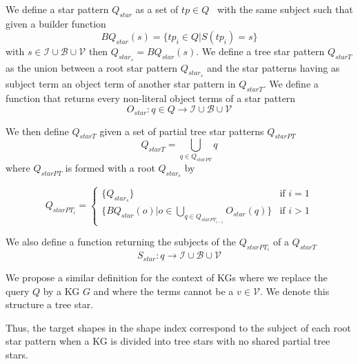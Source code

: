\begin{definition}\label{def:starPattern}
   We define a star pattern $Q_{star}$ as a set of $tp \in Q$~\cite{Karim2020} with the same subject such that 
   given a builder function 
   \begin{equation}
       BQ_{star}(s) = \{tp_i \in Q| S(tp_i) = s\}
   \end{equation}
   with $s \in \mathcal{I} \cup \mathcal{B} \cup \mathcal{V}$ then $Q_{star_s} = BQ_{star}(s)$.
   We define a tree star pattern $Q_{starT}$ as the union between a root star pattern $Q_{star_s}$
   and the star patterns having as subject term an object term of another star pattern in $Q_{starT}$.
   We define a function that returns every non-literal object terms of a star pattern
   \begin{equation}
       O_{star}: q \in Q \rightarrow  \mathcal{I} \cup \mathcal{B} \cup \mathcal{V}
   \end{equation}

   We then define $Q_{starT}$ given a  set of partial tree star patterns $Q_{starPT}$
   \begin{equation}
       Q_{starT} = \bigcup_{q \in Q_{starPT}} q
   \end{equation}
   where $Q_{starPT}$ is formed with a root $Q_{star_s}$ by

   \begin{equation}
           Q_{starPT_i} =
       \begin{cases}
           \{Q_{star_s}\} & \text{if } i = 1 \\
           \{BQ_{star}(o)| o \in \bigcup\limits_{q \in Q_{starPT_{i-1}}} O_{star}(q)\} & \text{if } i>1
       \end{cases}
   \end{equation}

   We also define a function returning the subjects of the $Q_{starPT_i}$ of a $Q_{starT}$
   \begin{equation}
       S_{star}: q \rightarrow  \mathcal{I} \cup \mathcal{B} \cup \mathcal{V}
   \end{equation}

   We propose a similar definition for the context of KGs where we replace the query $Q$ by a KG $G$ and where the terms 
   cannot be a $v \in \mathcal{V}$. 
   We denote this structure a tree star.
\end{definition}
Thus, the target shapes in the shape index correspond to the subject of each root star pattern when a KG is divided into tree stars with no shared partial tree stars.


